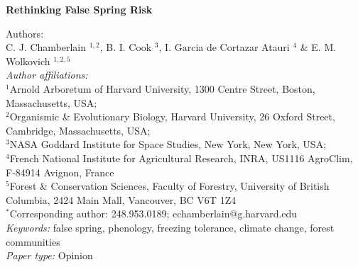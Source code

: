 \documentclass{article}\usepackage[]{graphicx}\usepackage[]{color}
\begin{document}
\noindent \textbf{\Large{Rethinking False Spring Risk}}

\noindent Authors:\\
C. J. Chamberlain $^{1,2}$, B. I. Cook $^{3}$, I. Garcia de Cortazar Atauri $^{4}$ \& E. M. Wolkovich $^{1,2,5}$
\vspace{2ex}\\
\emph{Author affiliations:}\\
$^{1}$Arnold Arboretum of Harvard University, 1300 Centre Street, Boston, Massachusetts, USA; \\
$^{2}$Organismic \& Evolutionary Biology, Harvard University, 26 Oxford Street, Cambridge, Massachusetts, USA; \\
$^{3}$NASA Goddard Institute for Space Studies, New York, New York, USA; \\
$^{4}$French National Institute for Agricultural Research, INRA, US1116 AgroClim, F-84914 Avignon, France\\
$^{5}$Forest \& Conservation Sciences, Faculty of Forestry, University of British Columbia, 2424 Main Mall, Vancouver, BC V6T 1Z4\\
\vspace{2ex}
$^*$Corresponding author: 248.953.0189; cchamberlain@g.harvard.edu\\

\noindent \emph{Keywords:} false spring, phenology, freezing tolerance, climate change, forest communities \\
\emph{Paper type:} Opinion

\renewcommand{\thetable}{\arabic{table}}
\renewcommand{\thefigure}{\arabic{figure}}
\renewcommand{\labelitemi}{$-$}


\newpage
\end{document}

